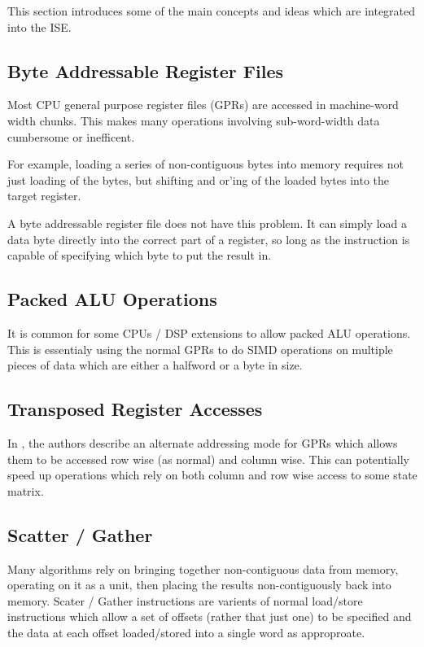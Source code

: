 
This section introduces some of the main concepts and ideas which are
integrated into the ISE.

\subsection{Byte Addressable Register Files}

Most CPU general purpose register files (GPRs) are accessed in machine-word
width chunks. This makes many operations involving sub-word-width data
cumbersome or inefficent.

For example, loading a series of non-contiguous bytes into memory requires
not just loading of the bytes, but shifting and or'ing of the loaded bytes
into the target register.

A byte addressable register file does not have this problem. It can simply
load a data byte directly into the correct part of a register, so long
as the instruction is capable of specifying which byte to put the result in.

\subsection{Packed ALU Operations}

It is common for some CPUs / DSP extensions to allow packed ALU operations.
This is essentialy using the normal GPRs to do SIMD operations on multiple
pieces of data which are either a halfword or a byte in size.

\subsection{Transposed Register Accesses}

In \cite{jung2000register}, the authors describe an alternate addressing mode
for GPRs which allows them to be accessed row wise (as normal) and
column wise. This can potentially speed up operations which rely on both
column and row wise access to some state matrix.

\subsection{Scatter / Gather}

Many algorithms rely on bringing together non-contiguous data from memory,
operating on it as a unit, then placing the results non-contiguously back
into memory. Scater / Gather instructions are varients of normal load/store
instructions which allow a set of offsets (rather that just one) to be
specified and the data at each offset loaded/stored into a single word
as approproate.

